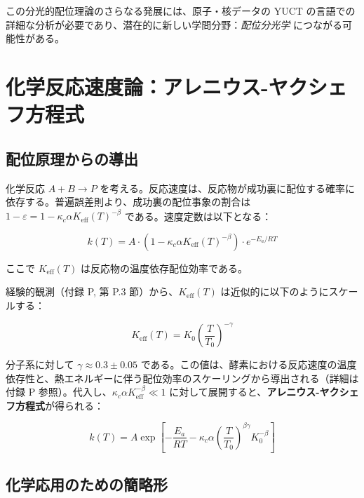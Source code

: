 \documentclass[11pt,a4paper]{article}
\newcommand{\Keff}{K_{\mathrm{eff}}}
\newcommand{\kappac}{\kappa_c}
\newcommand{\eps}{\varepsilon}
\begin{document}
	この分光的配位理論のさらなる発展には、原子・核データの YUCT の言語での詳細な分析が必要であり、潜在的に新しい学問分野：\emph{配位分光学} につながる可能性がある。
	
	\section{化学反応速度論：アレニウス-ヤクシェフ方程式}
	\label{sec:kinetics}
	
	\subsection{配位原理からの導出}
	
	化学反応 $A + B \rightarrow P$ を考える。反応速度は、反応物が成功裏に配位する確率に依存する。普遍誤差則より、成功裏の配位事象の割合は $1 - \eps = 1 - \kappac \alpha \Keff(T)^{-\beta}$ である。速度定数は以下となる：
	
	\begin{equation}
		k(T) = A \cdot (1 - \kappac \alpha \Keff(T)^{-\beta}) \cdot e^{-E_a/RT}
		\label{eq:arrhenius-base}
	\end{equation}
	
	ここで $\Keff(T)$ は反応物の温度依存配位効率である。
	
	経験的観測（付録 P, 第 P.3 節）から、$\Keff(T)$ は近似的に以下のようにスケールする：
	
	\begin{equation}
		\Keff(T) = K_0 \left(\frac{T}{T_0}\right)^{-\gamma}
		\label{eq:K-T-scaling}
	\end{equation}
	
	分子系に対して $\gamma \approx 0.3 \pm 0.05$ である。この値は、酵素における反応速度の温度依存性と、熱エネルギーに伴う配位効率のスケーリングから導出される（詳細は付録 P 参照）。代入し、$\kappac \alpha \Keff^{-\beta} \ll 1$ に対して展開すると、\textbf{アレニウス-ヤクシェフ方程式}が得られる：
	
	\begin{equation}
		\boxed{k(T) = A \exp\left[-\frac{E_a}{RT} - \kappac \alpha \left(\frac{T}{T_0}\right)^{\beta\gamma} K_0^{-\beta}\right]}
		\label{eq:arrhenius-yakushev}
	\end{equation}
	
	\subsection{化学応用のための簡略形}
	
\end{document}
